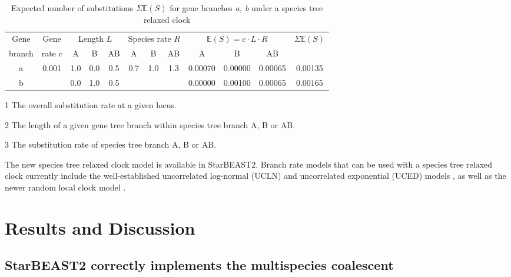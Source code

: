 \documentclass[nogrid]{MBE}%
\begin{document}
\begin{table}[htb!]
\caption{Expected number of substitutions $\Sigma \mathbb{E}(S)$ for gene branches \textit{a, b} under a species tree relaxed clock}
\label{tab:branchRateModel}
\begin{threeparttable}
\begin{tabular*}{\textwidth}{@{\extracolsep{\fill}}cccccccccccc@{}}
\hline
Gene & Gene & \multicolumn{3}{c}{Length\tnote{2} $L$} & \multicolumn{3}{c}{Species rate\tnote{3} $R$} & \multicolumn{3}{c}{$\mathbb{E}(S) = c\cdot L\cdot R$} & \multirow{2}{*}{$\Sigma \mathbb{E}(S)$}\tabularnewline
branch & rate\tnote{1} $c$ & A & B & AB & A & B & AB & A & B & AB & \tabularnewline
\hline
a & \multirow{2}{*}{0.001} & 1.0 & 0.0 & 0.5 & \multirow{2}{*}{0.7} & \multirow{2}{*}{1.0} & \multirow{2}{*}{1.3} & 0.00070 & 0.00000 & 0.00065 & 0.00135\tabularnewline
b & & 0.0 & 1.0 & 0.5 & & & & 0.00000 & 0.00100 & 0.00065 & 0.00165\tabularnewline
\hline
\end{tabular*}
\begin{tablenotes}
\item[1] The overall substitution rate at a given locus.
\item[2] The length of a given gene tree branch within species tree branch A, B or AB.
\item[3] The substitution rate of species tree branch A, B or AB.
\end{tablenotes}
\end{threeparttable}
\end{table}

The new species tree relaxed clock model is available in StarBEAST2. Branch rate
models that can be used with a species tree relaxed clock currently include the
well-established uncorrelated log-normal (UCLN) and uncorrelated exponential
(UCED) models \citep{10.1371/journal.pbio.0040088}, as well as the newer random
local clock model \citep{Drummond2010}.

\section{Results and Discussion}

\subsection{StarBEAST2 correctly implements the multispecies coalescent}
\end{document}

